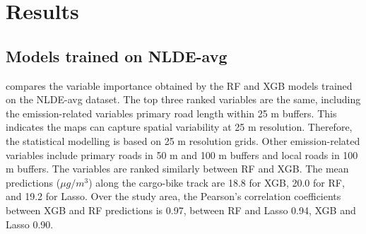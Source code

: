 \documentclass{article}
\begin{document}
 

\section{Results}
\subsection{Models trained on NLDE-avg}

 compares the variable importance obtained by the RF and XGB models trained on the NLDE-avg dataset. The top three ranked variables are the same, including the emission-related variables primary road length within 25 m buffers. This indicates the maps can capture spatial variability at 25 m resolution. Therefore, the statistical modelling is based on 25 m resolution grids. Other emission-related variables include primary roads in 50 m and 100 m buffers and local roads in 100 m buffers. The variables are ranked similarly between RF and XGB. 
The mean predictions ($\mu g/m^3$) along the cargo-bike track are 18.8 for XGB, 20.0 for RF, and 19.2 for Lasso. Over the study area, the Pearson's correlation coefficients between XGB and RF predictions is 0.97, between RF and Lasso 0.94, XGB and Lasso 0.90.

 
\end{document}
